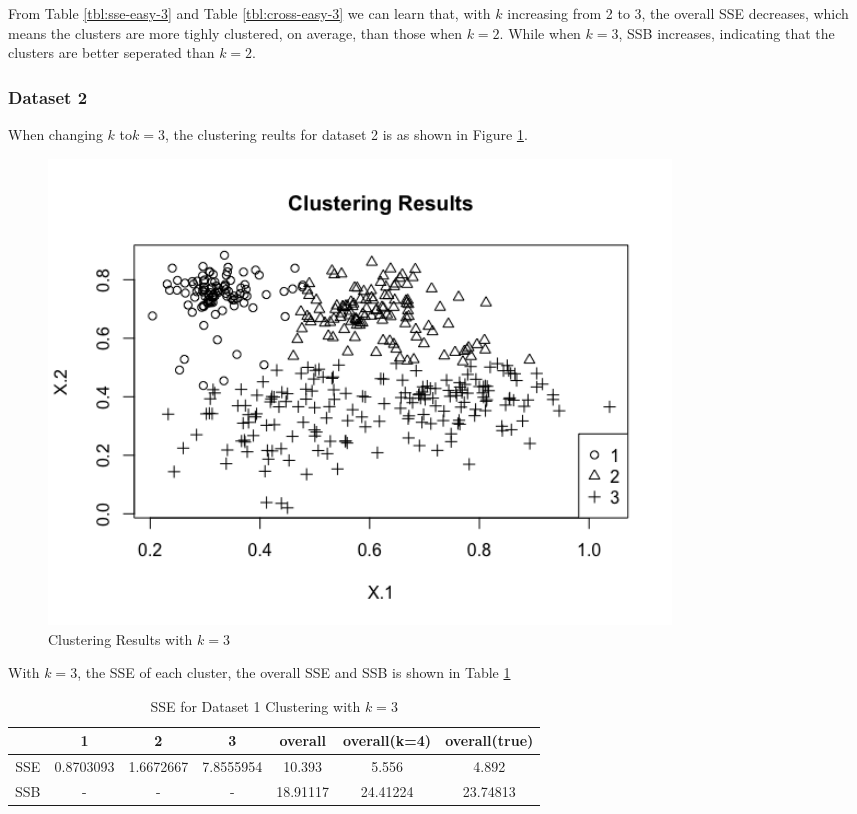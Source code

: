 \documentclass{article}
\begin{document}
		From Table \ref{tbl:sse-easy-3} and Table \ref{tbl:cross-easy-3} we can learn that, with $k$ increasing from 2 to 3, the overall SSE decreases, which means the clusters are more tighly clustered, on average, than those when $k=2$. While when $k=3$, SSB increases, indicating that the clusters are better seperated than $k=2$.

		\subsubsection{Dataset 2}
		When changing $k$ to$k=3$, the clustering reults for dataset 2 is as shown in Figure \ref{fig:hard-3-cluster}.

		\begin{figure}[H]
		\centering
		\includegraphics[width = 0.8\textwidth]{hard-cluster-3.png}
		\caption{Clustering Results with $k=3$}
		\label{fig:hard-3-cluster}
		\end{figure}

		With $k = 3$, the SSE of each cluster, the overall SSE and SSB is shown in Table \ref{tbl:sse-hard-3}

		\begin{table}[H]
		\centering
			\begin{tabular}{|c|c|c|c|c|c|c|}
			\hline
			& 1 & 2& 3& overall & overall(k=4)& overall(true) \\
			\hline
			\hline
			SSE & 0.8703093 & 1.6672667 & 7.8555954 & 10.393 & 5.556 & 4.892\\
			\hline
			SSB & - & - & - & 18.91117 & 24.41224 & 23.74813\\
			\hline
			\end{tabular}
			\caption{SSE for Dataset 1 Clustering with $k=3$}
			\label{tbl:sse-hard-3}
		\end{table}
\end{document}
